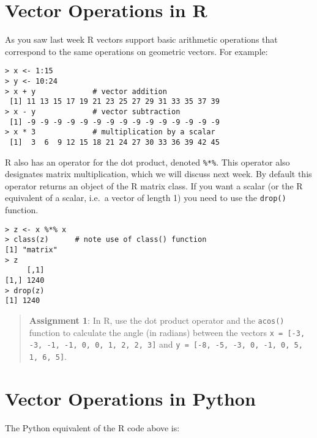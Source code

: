 
\section{Vector Operations in R}

As you saw last week R vectors support basic arithmetic operations that
correspond to the same operations on geometric vectors. For example:

\begin{lstlisting}
> x <- 1:15
> y <- 10:24
> x + y             # vector addition
 [1] 11 13 15 17 19 21 23 25 27 29 31 33 35 37 39
> x - y             # vector subtraction
 [1] -9 -9 -9 -9 -9 -9 -9 -9 -9 -9 -9 -9 -9 -9 -9
> x * 3             # multiplication by a scalar
 [1]  3  6  9 12 15 18 21 24 27 30 33 36 39 42 45 
\end{lstlisting}
R also has an operator for the dot product, denoted \lstinline!%*%!.
This operator also designates matrix multiplication, which we will
discuss next week. By default this operator returns an object of the R
matrix class. If you want a scalar (or the R equivalent of a scalar,
i.e.~a vector of length 1) you need to use the \lstinline!drop()!
function.

\begin{lstlisting}
> z <- x %*% x
> class(z)      # note use of class() function
[1] "matrix"
> z
     [,1]
[1,] 1240
> drop(z)
[1] 1240
\end{lstlisting}
\begin{quote}
\textbf{Assignment 1}: In R, use the dot product operator and the
\lstinline!acos()! function to calculate the angle (in radians) between
the vectors \lstinline!x = [-3, -3, -1, -1, 0, 0, 1, 2, 2, 3]! and
\lstinline!y = [-8, -5, -3, 0, -1, 0, 5, 1, 6, 5]!.

\end{quote}

\section{Vector Operations in Python}

The Python equivalent of the R code above is:


